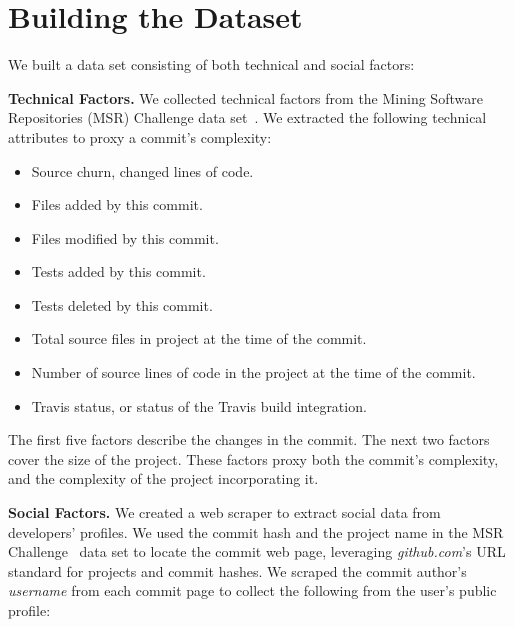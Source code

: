 \documentclass[10pt, conference]{IEEEtran}
\begin{document}
\section{Building the Dataset}
\label{approach}

We built a data set consisting of both technical and social factors:

\vspace{1ex}
\noindent\textbf{Technical Factors.} We collected technical factors from the 
Mining Software Repositories (MSR) Challenge data set~\cite{msr17challenge}.
We extracted the following technical attributes to proxy a commit's
complexity: 
\begin{itemize}
\item Source churn, changed lines of code.
\item Files added by this commit.
\item Files modified by this commit.
\item Tests added by this commit.
\item Tests deleted by this commit.
\item Total source files in project at the time of the commit.
\item Number of source lines of code in the project at
	the time of the commit.
\item Travis status, or status of the Travis build integration.
\end{itemize}

The first five factors describe the changes in the commit.  The next two
factors cover the size of the project.  These factors proxy both the commit's complexity,
and the complexity of the project incorporating it.

\vspace{1ex}
\noindent\textbf{Social Factors.} We created a web scraper to extract social data
from developers' profiles.
We used the commit hash and the project name in the 
MSR Challenge~\cite{msr17challenge} data set to locate the
commit web page, leveraging \textit{github.com}'s URL standard for projects and
commit hashes.
%
We scraped the commit author's
\textit{username} from each commit page to
collect the following from the user's public profile:
%
\end{document}
